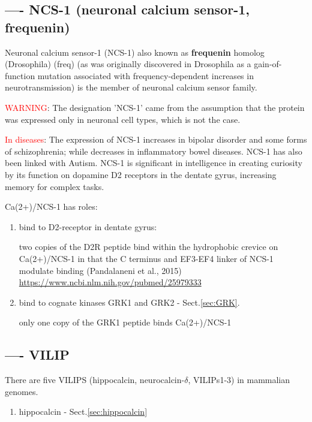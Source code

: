 \subsection{---- NCS-1 (neuronal calcium sensor-1, frequenin)}
\label{sec:NCS-1}
\label{sec:frequenin}

Neuronal calcium sensor-1 (NCS-1) also known as {\bf frequenin} homolog
(Drosophila) (freq) (as was originally discovered in Drosophila as a
gain-of-function mutation associated with frequency-dependent increases in
neurotransmission) is the member of neuronal calcium sensor family.

\textcolor{red}{WARNING}: The designation 'NCS-1' came from the assumption that
the protein was expressed only in neuronal cell types, which is not the case.

\textcolor{red}{In diseases}:
The expression of NCS-1 increases in bipolar disorder and some forms of
schizophrenia; while decreases in  inflammatory bowel diseases. NCS-1 has also
been linked with Autism. NCS-1 is significant in intelligence in creating
curiosity by its function on dopamine D2 receptors in the dentate gyrus,
increasing memory for complex tasks.

Ca(2+)/NCS-1 has roles:
\begin{enumerate}
  \item bind to D2-receptor in dentate gyrus: 
  
   two copies of the D2R peptide bind within the hydrophobic crevice on
  Ca(2+)/NCS-1 in that the  C terminus and EF3-EF4 linker of NCS-1
  modulate binding (Pandalaneni et al., 2015)
  \url{https://www.ncbi.nlm.nih.gov/pubmed/25979333}
  
  \item bind to cognate kinases GRK1 and GRK2 - Sect.\ref{sec:GRK}.
  
  only one copy of the GRK1 peptide binds Ca(2+)/NCS-1
   
\end{enumerate}

\subsection{---- VILIP}
\label{sec:VILIP}

There are five VILIPS (hippocalcin, neurocalcin-$\delta$, VILIPs1-3) in
mammalian genomes. 
\begin{enumerate}
  \item hippocalcin - Sect.\ref{sec:hippocalcin}
\end{enumerate}

